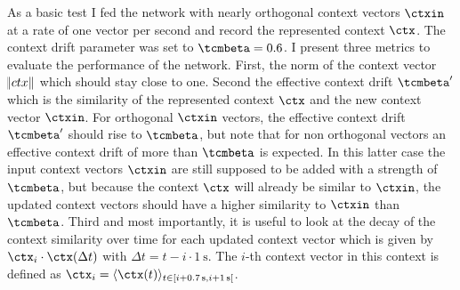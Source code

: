 As a basic test I fed the network with nearly orthogonal context vectors $\ctxin$ at a rate of one vector per second and record the represented context $\ctx$.
The context drift parameter was set to $\tcmbeta = 0.6$.
I present three metrics to evaluate the performance of the network.
First, the norm of the context vector $\norm{ctx}$ which should stay close to one.
Second the effective context drift $\tcmbeta'$ which is the similarity of the represented context $\ctx$ and the new context vector $\ctxin$.
For orthogonal $\ctxin$ vectors, the effective context drift $\tcmbeta'$ should rise to $\tcmbeta$, but note that for non orthogonal vectors an effective context drift of more than $\tcmbeta$ is expected.
In this latter case the input context vectors $\ctxin$ are still supposed to be added with a strength of $\tcmbeta$, but because the context $\ctx$ will already be similar to $\ctxin$, the updated context vectors should have a higher similarity to $\ctxin$ than $\tcmbeta$.
Third and most importantly, it is useful to look at the decay of the context similarity over time for each updated context vector which is given by $\ctx_i \cdot \ctx(\Delta t)$ with $\Delta t = t - i \cdot \SI{1}{\second}$.
The $i$-th context vector in this context is defined as $\ctx_i = \langle \ctx(t) \rangle_{t \in \interval[open right]{i + \SI{0.7}{\second}}{i + \SI{1}{\second}}}$.

